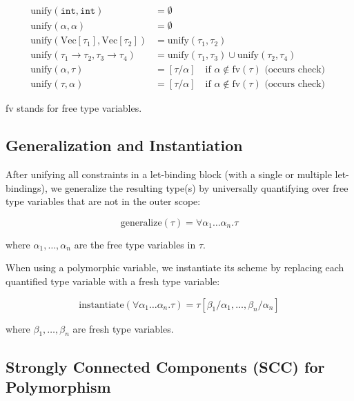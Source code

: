 \documentclass[12pt]{article}
\newcommand{\type}{\tau}
\begin{document}
\begin{align*}
\text{unify}(\mathtt{int}, \mathtt{int}) &= \emptyset \\
\text{unify}(\alpha, \alpha) &= \emptyset \\
\text{unify}(\text{Vec}[\type_1], \text{Vec}[\type_2]) &= \text{unify}(\type_1, \type_2) \\
\text{unify}(\type_1 \to \type_2, \type_3 \to \type_4) &= \text{unify}(\type_1, \type_3) \cup \text{unify}(\type_2, \type_4) \\
\text{unify}(\alpha, \type) &= [\type/\alpha] \quad \text{if } \alpha \notin \text{fv}(\type) \text{ (occurs check) } \\
\text{unify}(\type, \alpha) &= [\type/\alpha] \quad \text{if } \alpha \notin \text{fv}(\type) \text{ (occurs check) }
\end{align*}

fv stands for free type variables. 

\subsection{Generalization and Instantiation}

After unifying all constraints in a let-binding block (with a single or multiple let-bindings), we generalize the resulting type(s) by universally quantifying over free type variables that are not in the outer scope:

\begin{equation*}
\text{generalize}(\type) = \forall \alpha_1 \ldots \alpha_n . \type
\end{equation*}

where $\alpha_1, \ldots, \alpha_n$ are the free type variables in $\type$.

When using a polymorphic variable, we instantiate its scheme by replacing each quantified type variable with a fresh type variable:

\begin{equation*}
\text{instantiate}(\forall \alpha_1 \ldots \alpha_n . \type) = \type[\beta_1/\alpha_1, \ldots, \beta_n/\alpha_n]
\end{equation*}

where $\beta_1, \ldots, \beta_n$ are fresh type variables.

\subsection{Strongly Connected Components (SCC) for Polymorphism}
\end{document}
